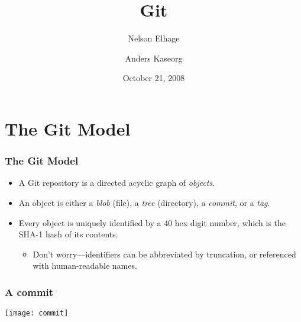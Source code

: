 \documentclass{beamer}
\title{Git}
\author{Nelson Elhage\and Anders Kaseorg}
\institute{Student Information Processing Board}
\date{October 21, 2008}
\begin{document}
\begin{frame}
    \titlepage
\end{frame}

\section{The Git Model}

\begin{frame}
  \frametitle{The Git Model}

  \begin{itemize}
  \item A Git repository is a directed acyclic graph of
    \emph{objects}.
  \item An object is either a \emph{blob} (file), a \emph{tree}
    (directory), a \emph{commit}, or a \emph{tag}.
  \item Every object is uniquely identified by a 40 hex digit number,
    which is the SHA-1 hash of its contents.
    \begin{itemize}
    \item Don't worry---identifiers can be abbreviated by truncation,
      or referenced with human-readable names.
    \end{itemize}
  \end{itemize}
\end{frame}

\begin{frame}
  \frametitle{A commit}
  \texttt{[image: commit]}
\end{frame}
\end{document}
